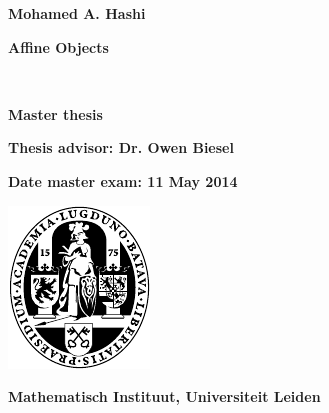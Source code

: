 \thispagestyle{empty}
\vspace*{7em}

\begin{center}

{\large\textbf{Mohamed A. Hashi}\par} \vspace{3em} {\LARGE \textbf{Affine Objects}\par} \
\vspace{3em} 

{\large\textbf{Master thesis}\par} \vspace{1em} {\large\textbf{Thesis advisor: Dr. Owen Biesel} \par} \vspace{3em} 
{\large\textbf{Date master exam: 11 May 2014}\par}\vfill

\includegraphics{ulzegel.pdf}\\

\vspace{2em}

{\large\textbf{Mathematisch Instituut, Universiteit Leiden}}

\end{center}